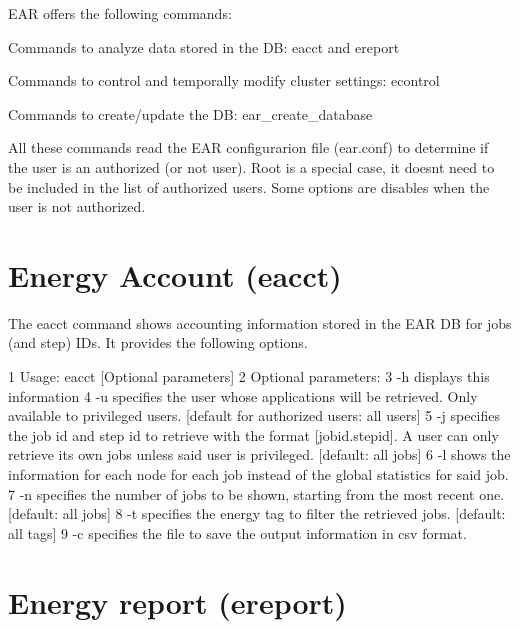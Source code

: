 E\+AR offers the following commands\+:
\begin{DoxyItemize}
\item Commands to analyze data stored in the DB\+: eacct and ereport
\item Commands to control and temporally modify cluster settings\+: econtrol
\item Commands to create/update the DB\+: ear\+\_\+create\+\_\+database
\end{DoxyItemize}

All these commands read the E\+AR configurarion file (ear.\+conf) to determine if the user is an authorized (or not user). Root is a special case, it doesn\textquotesingle{}t need to be included in the list of authorized users. Some options are disables when the user is not authorized.

\section*{Energy Account (eacct)}

The eacct command shows accounting information stored in the E\+AR DB for jobs (and step) I\+Ds. It provides the following options. 
\begin{DoxyCode}
1 Usage: eacct [Optional parameters]
2     Optional parameters: 
3         -h  displays this information
4         -u  specifies the user whose applications will be retrieved. Only available to privileged users.
       [default for authorized users: all users]
5         -j  specifies the job id and step id to retrieve with the format [jobid.stepid]. A user can only
       retrieve its own jobs unless said user is privileged. [default: all jobs]
6         -l  shows the information for each node for each job instead of the global statistics for said job.
7         -n  specifies the number of jobs to be shown, starting from the most recent one. [default: all
       jobs]
8         -t  specifies the energy tag to filter the retrieved jobs. [default: all tags]
9         -c  specifies the file to save the output information in csv format.
\end{DoxyCode}


\section*{Energy report (ereport)}

